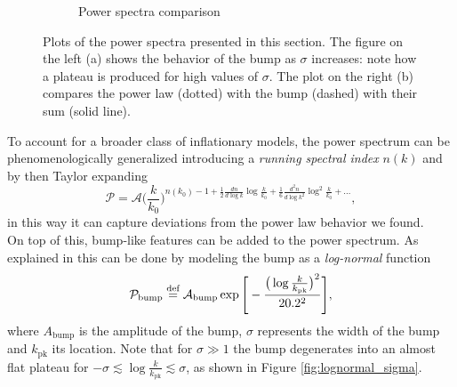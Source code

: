 \begin{figure}
\begin{subfigure}[b]{0.45\textwidth}
\caption{Power spectra comparison}
\label{fig:PS_comp}
\end{subfigure}
\caption{Plots of the power spectra presented in this section. The figure on the left (a) shows the behavior of the bump as $\sigma$ increases: note how a plateau is produced for high values of $\sigma$. The plot on the right (b) compares the power law (dotted) with the bump (dashed) with their sum (solid line). }
\end{figure}

To account for a broader class of inflationary models, the power spectrum can be phenomenologically generalized introducing a \emph{running spectral index} $n(k)$ and by then Taylor expanding
\begin{equation}
    \mathcal P=\mathcal{A}\bigg(\frac{k}{k_0}\bigg)^{n(k_0)-1+\frac{1}{2}\frac{d n}{d\log k}\log\frac{k}{k_0}+\frac{1}{6}\frac{d^2 n}{d\log k^2}\log^2\frac{k}{k_0}+\dots},
\end{equation}
in this way it can capture deviations from the power law behavior we found.\\
On top of this, bump-like features can be added to the power spectrum. As explained in \cite{Hamann_2022} this can be done by modeling the bump as a \emph{log-normal} function
\begin{equation}
    \mathcal P_\text{bump}\stackrel{\text{def}}{=} \mathcal A_\text{bump}\exp\Bigg[-\frac{\big(\log\frac{k}{k_{\text{pk}}}\big)^2}{20.2^2}\Bigg],\label{eq:lognormal}
\end{equation}
where $A_\text{bump}$ is the amplitude of the bump, $\sigma$ represents the width of the bump and $k_\text{pk}$ its location.  Note that for $\sigma\gg 1$ the bump degenerates into an almost flat plateau for $-\sigma\lesssim \log\frac{k}{k_{\text{pk}}}\lesssim\sigma $, as shown in Figure \ref{fig:lognormal_sigma}.



 

